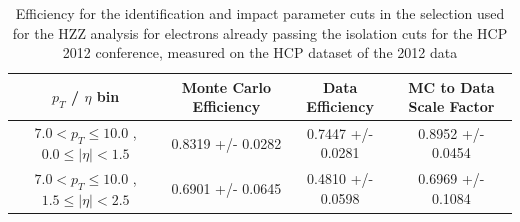 \documentclass{cmspaper}
\begin{document}
 \begin{table}[!ht]
 \begin{center} 
 \begin{tabular}{|c|c|c|c|}
 \hline
 $p_{T}$ / $\eta$ bin    &  Monte Carlo Efficiency    &  Data Efficiency   &  MC to Data Scale Factor \\   \hline           
$  7.0 < p_{T} \le  10.0$ , $  0.0  \le |\eta| <   1.5$   &       0.8319 +/- 0.0282   &       0.7447 +/- 0.0281   &       0.8952 +/- 0.0454   \\   
\hline
$  7.0 < p_{T} \le  10.0$ , $  1.5  \le |\eta| <   2.5$   &       0.6901 +/- 0.0645   &       0.4810 +/- 0.0598   &       0.6969 +/- 0.1084   \\   
\hline
\end{tabular}
\caption{ Efficiency for the identification and impact parameter cuts in the selection used for the HZZ analysis
  for electrons already passing the isolation cuts for the HCP 2012 conference, 
  measured on the HCP dataset of the 2012 data  }
\label{tab:Efficiency_HZZICHEP2012IDGivenIso_HCP2012}
\end{center}
\end{table}
\end{document}
